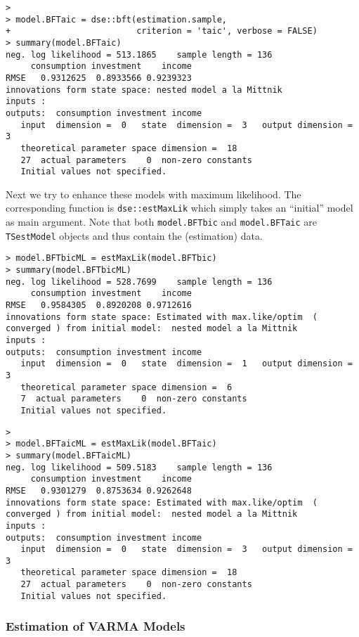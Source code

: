 \documentclass[]{article}
\begin{document}
\begin{verbatim}
> 
> model.BFTaic = dse::bft(estimation.sample, 
+                         criterion = 'taic', verbose = FALSE)
> summary(model.BFTaic)
neg. log likelihood = 513.1865    sample length = 136 
     consumption investment    income
RMSE   0.9312625  0.8933566 0.9239323
innovations form state space: nested model a la Mittnik 
inputs :  
outputs:  consumption investment income 
   input  dimension =  0   state  dimension =  3   output dimension =  3 
   theoretical parameter space dimension =  18 
   27  actual parameters    0  non-zero constants
   Initial values not specified.
\end{verbatim}

Next we try to enhance these models with maximum likelihood. The
corresponding function is \texttt{dse::estMaxLik} which simply takes an
``initial'' model as main argument. Note that both \texttt{model.BFTbic}
and \texttt{model.BFTaic} are \texttt{TSestModel} objects and thus
contain the (estimation) data.

\begin{verbatim}
> model.BFTbicML = estMaxLik(model.BFTbic)
> summary(model.BFTbicML)
neg. log likelihood = 528.7699    sample length = 136 
     consumption investment    income
RMSE   0.9584305  0.8920208 0.9712616
innovations form state space: Estimated with max.like/optim  ( converged ) from initial model:  nested model a la Mittnik 
inputs :  
outputs:  consumption investment income 
   input  dimension =  0   state  dimension =  1   output dimension =  3 
   theoretical parameter space dimension =  6 
   7  actual parameters    0  non-zero constants
   Initial values not specified.
\end{verbatim}

\begin{verbatim}
> 
> model.BFTaicML = estMaxLik(model.BFTaic)
> summary(model.BFTaicML)
neg. log likelihood = 509.5183    sample length = 136 
     consumption investment    income
RMSE   0.9301279  0.8753634 0.9262648
innovations form state space: Estimated with max.like/optim  ( converged ) from initial model:  nested model a la Mittnik 
inputs :  
outputs:  consumption investment income 
   input  dimension =  0   state  dimension =  3   output dimension =  3 
   theoretical parameter space dimension =  18 
   27  actual parameters    0  non-zero constants
   Initial values not specified.
\end{verbatim}

\subsubsection{Estimation of VARMA
Models}\label{estimation-of-varma-models}
\end{document}
